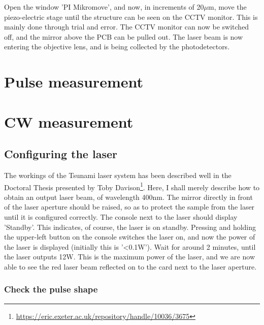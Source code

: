 \documentclass[14pt,a4paper] {article}
\begin{document}
Open the window 'PI Mikromove', and now, in increments of 20$\mu$m, move the piezo-electric stage until the structure can be seen on the CCTV monitor. This is mainly done through trial and error. The CCTV monitor can now be switched off, and the mirror above the PCB can be pulled out. The laser beam is now entering the objective lens, and is being collected by the photodetectors.

\section{Pulse measurement}

\section{CW measurement}


\subsection{Configuring the laser}

The workings of the Tsunami laser system has been described well in the Doctoral Thesis presented by Toby Davison\footnote{\url{https://eric.exeter.ac.uk/repository/handle/10036/3675}}. Here, I shall merely describe how to obtain an output laser beam, of wavelength 400nm. The mirror directly in front of the laser aperture should be raised, so as to protect the sample from the laser until it is configured correctly. The console next to the laser should display 'Standby'. This indicates, of course, the laser is on standby. Pressing and holding the upper-left button on the console switches the laser on, and now the power of the laser is displayed (initially this is '<0.1W'). Wait for around 2 minutes, until the laser outputs 12W. This is the maximum power of the laser, and we are now able to see the red laser beam reflected on to the card next to the laser aperture.


\subsubsection{Check the pulse shape}

\end{document}
